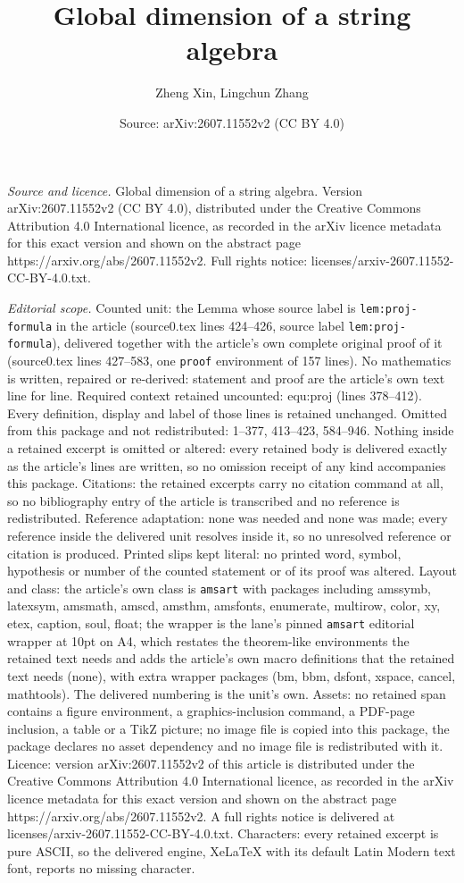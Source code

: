 \documentclass[10pt,a4paper]{amsart}
\title[Global dimension of a string algebra]{Global dimension of a string algebra}
\author{Zheng Xin, Lingchun Zhang}
\date{Source: arXiv:2607.11552v2 (CC BY 4.0)}
\begin{document}
\maketitle

\noindent\emph{Source and licence.} Global dimension of a string algebra. Version arXiv:2607.11552v2 (CC BY 4.0), distributed under the Creative Commons Attribution 4.0 International licence, as recorded in the arXiv licence metadata for this exact version and shown on the abstract page https://arxiv.org/abs/2607.11552v2. Full rights notice: licenses/arxiv-2607.11552-CC-BY-4.0.txt.\par\smallskip

\noindent\textit{Editorial scope.} Counted unit: the Lemma whose source label is \texttt{lem:proj-formula} in the article (source0.tex lines 424--426, source label \texttt{lem:proj-formula}), delivered together with the article's own complete original proof of it (source0.tex lines 427--583, one \texttt{proof} environment of 157 lines). No mathematics is written, repaired or re-derived: statement and proof are the article's own text line for line. Required context retained uncounted: equ:proj (lines 378--412). Every definition, display and label of those lines is retained unchanged. Omitted from this package and not redistributed: 1--377, 413--423, 584--946. Nothing inside a retained excerpt is omitted or altered: every retained body is delivered exactly as the article's lines are written, so no omission receipt of any kind accompanies this package. Citations: the retained excerpts carry no citation command at all, so no bibliography entry of the article is transcribed and no reference is redistributed. Reference adaptation: none was needed and none was made; every reference inside the delivered unit resolves inside it, so no unresolved reference or citation is produced. Printed slips kept literal: no printed word, symbol, hypothesis or number of the counted statement or of its proof was altered. Layout and class: the article's own class is \texttt{amsart} with packages including amssymb, latexsym, amsmath, amscd, amsthm, amsfonts, enumerate, multirow, color, xy, etex, caption, soul, float; the wrapper is the lane's pinned \texttt{amsart} editorial wrapper at 10pt on A4, which restates the theorem-like environments the retained text needs and adds the article's own macro definitions that the retained text needs (none), with extra wrapper packages (bm, bbm, dsfont, xspace, cancel, mathtools). The delivered numbering is the unit's own. Assets: no retained span contains a figure environment, a graphics-inclusion command, a PDF-page inclusion, a table or a TikZ picture; no image file is copied into this package, the package declares no asset dependency and no image file is redistributed with it. Licence: version arXiv:2607.11552v2 of this article is distributed under the Creative Commons Attribution 4.0 International licence, as recorded in the arXiv licence metadata for this exact version and shown on the abstract page https://arxiv.org/abs/2607.11552v2. A full rights notice is delivered at licenses/arxiv-2607.11552-CC-BY-4.0.txt. Characters: every retained excerpt is pure ASCII, so the delivered engine, XeLaTeX with its default Latin Modern text font, reports no missing character.
\end{document}
